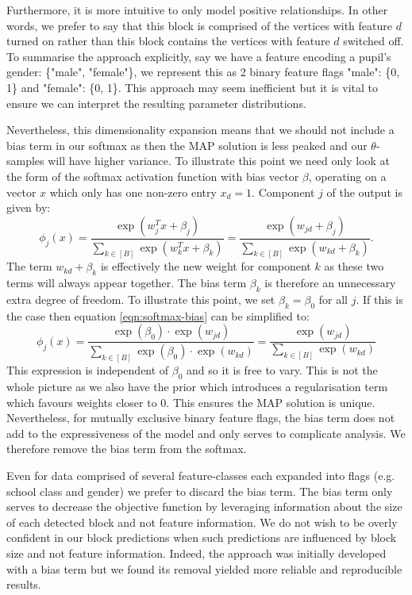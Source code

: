 Furthermore, it is more intuitive to only model positive relationships. In other words, we prefer to say that this block is comprised of the vertices with feature $d$ turned on rather than this block contains the vertices with feature $d$ switched off. To summarise the approach explicitly, say we have a feature encoding a pupil's gender: \{"male", "female"\}, we represent this as 2 binary feature flags "male": \{0, 1\} and "female": \{0, 1\}. This approach may seem inefficient but it is vital to ensure we can interpret the resulting parameter distributions.

Nevertheless, this dimensionality expansion means that we should not include a bias term in our softmax as then the MAP solution is less peaked and our $\theta$-samples will have higher variance. To illustrate this point we need only look at the form of the softmax activation function with bias vector $\beta$, operating on a vector $x$ which only has one non-zero entry $x_d=1$. Component $j$ of the output is given by:
%
\begin{equation}
	\phi_j(x) = \frac{\exp(w_j^T x + \beta_j)}{\sum_{k \in [B]} \exp(w_k^T x + \beta_k)} = 
	\frac{\exp(w_{jd} + \beta_j)}{\sum_{k \in [B]} \exp({w_{kd} + \beta_k})}.
	\label{eqn:softmax-bias}
\end{equation}
%
The term $w_{kd} + \beta_k$ is effectively the new weight for component $k$ as these two terms will always appear together. The bias term $\beta_k$ is therefore an unnecessary extra degree of freedom. To illustrate this point, we set $\beta_k=\beta_0$ for all $j$. If this is the case then equation \ref{eqn:softmax-bias} can be simplified to:
%
\begin{equation}
	\phi_j(x) = \frac{\exp(\beta_0) \cdot \exp(w_{jd})}{\sum_{k \in [B]} \exp(\beta_0) \cdot \exp(w_{kd})}
	= \frac{\exp(w_{jd})}{\sum_{k \in [B]} \exp(w_{kd})}
\end{equation}
%
This expression is independent of $\beta_0$ and so it is free to vary. This is not the whole picture as we also have the prior which introduces a regularisation term which favours weights closer to 0. This ensures the MAP solution is unique. Nevertheless, for mutually exclusive binary feature flags, the bias term does not add to the expressiveness of the model and only serves to complicate analysis. We therefore remove the bias term from the softmax.

Even for data comprised of several feature-classes each expanded into flags (e.g. school class and gender) we prefer to discard the bias term. The bias term only serves to decrease the objective function by leveraging information about the size of each detected block and not feature information. We do not wish to be overly confident in our block predictions when such predictions are influenced by block size and not feature information. Indeed, the approach was initially developed with a bias term but we found its removal yielded more reliable and reproducible results.